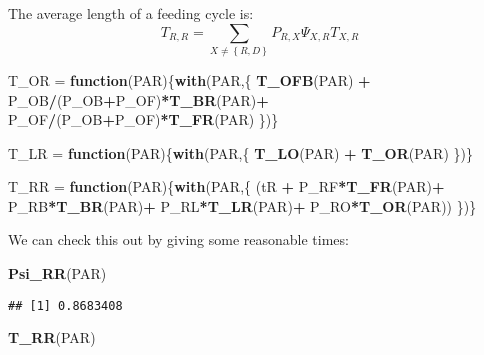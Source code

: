 \documentclass[]{article}
\newenvironment{Shaded}{\begin{snugshade}}{\end{snugshade}}
\newcommand{\ControlFlowTok}[1]{\textcolor[rgb]{0.13,0.29,0.53}{\textbf{#1}}}
\newcommand{\KeywordTok}[1]{\textcolor[rgb]{0.13,0.29,0.53}{\textbf{#1}}}
\newcommand{\NormalTok}[1]{#1}
\newcommand{\OperatorTok}[1]{\textcolor[rgb]{0.81,0.36,0.00}{\textbf{#1}}}
\newcommand{\StringTok}[1]{\textcolor[rgb]{0.31,0.60,0.02}{#1}}
\begin{document}
The average length of a feeding cycle is:
\[T_{R,R} = \sum_{X \neq \left\{R,D\right\}} P_{R,X} \Psi_{X,R} T_{X,R} \]

\begin{Shaded}
\begin{Highlighting}[]
\NormalTok{T_OR =}\StringTok{ }\ControlFlowTok{function}\NormalTok{(PAR)\{}\KeywordTok{with}\NormalTok{(PAR,\{}
  \KeywordTok{T_OFB}\NormalTok{(PAR) }\OperatorTok{+}\StringTok{ }\NormalTok{P_OB}\OperatorTok{/}\NormalTok{(P_OB}\OperatorTok{+}\NormalTok{P_OF)}\OperatorTok{*}\KeywordTok{T_BR}\NormalTok{(PAR)}\OperatorTok{+}\StringTok{ }\NormalTok{P_OF}\OperatorTok{/}\NormalTok{(P_OB}\OperatorTok{+}\NormalTok{P_OF)}\OperatorTok{*}\KeywordTok{T_FR}\NormalTok{(PAR)}
\NormalTok{\})\}}

\NormalTok{T_LR =}\StringTok{ }\ControlFlowTok{function}\NormalTok{(PAR)\{}\KeywordTok{with}\NormalTok{(PAR,\{}
  \KeywordTok{T_LO}\NormalTok{(PAR) }\OperatorTok{+}\StringTok{ }\KeywordTok{T_OR}\NormalTok{(PAR)}
\NormalTok{\})\}}
\end{Highlighting}
\end{Shaded}

\begin{Shaded}
\begin{Highlighting}[]
\NormalTok{T_RR =}\StringTok{ }\ControlFlowTok{function}\NormalTok{(PAR)\{}\KeywordTok{with}\NormalTok{(PAR,\{}
\NormalTok{  (tR }\OperatorTok{+}
\StringTok{  }\NormalTok{P_RF}\OperatorTok{*}\KeywordTok{T_FR}\NormalTok{(PAR)}\OperatorTok{+}
\StringTok{  }\NormalTok{P_RB}\OperatorTok{*}\KeywordTok{T_BR}\NormalTok{(PAR)}\OperatorTok{+}
\StringTok{  }\NormalTok{P_RL}\OperatorTok{*}\KeywordTok{T_LR}\NormalTok{(PAR)}\OperatorTok{+}
\StringTok{  }\NormalTok{P_RO}\OperatorTok{*}\KeywordTok{T_OR}\NormalTok{(PAR))}
\NormalTok{\})\}}
\end{Highlighting}
\end{Shaded}

We can check this out by giving some reasonable times:

\begin{Shaded}
\begin{Highlighting}[]
\KeywordTok{Psi_RR}\NormalTok{(PAR)}
\end{Highlighting}
\end{Shaded}

\begin{verbatim}
## [1] 0.8683408
\end{verbatim}

\begin{Shaded}
\begin{Highlighting}[]
\KeywordTok{T_RR}\NormalTok{(PAR)}
\end{Highlighting}
\end{Shaded}
\end{document}
